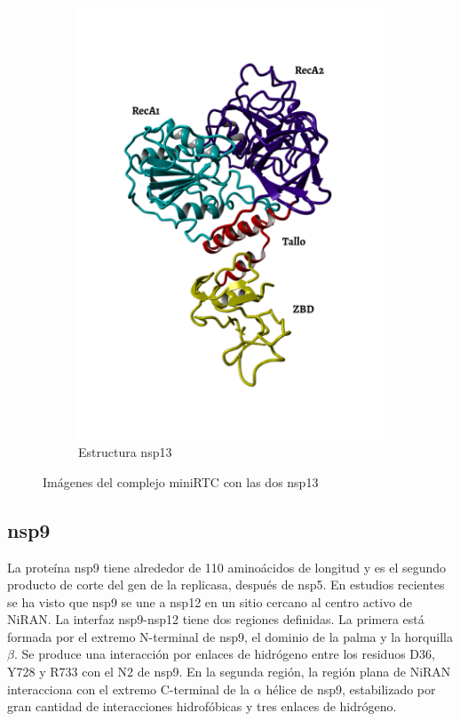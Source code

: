 \documentclass[a4paper,11pt]{report}
\begin{document}
\begin{figure}[h!]
\begin{subfigure}[h]{0.45\textwidth}
		\includegraphics[width=1.2\linewidth]{Figuras/Figura9}
		\caption{Estructura nsp13}		
		\label{13}
	\end{subfigure}
   
   \caption{Imágenes del complejo miniRTC con las dos nsp13}
   
\end{figure}

\subsection{nsp9}
La proteína nsp9 tiene alrededor de 110 aminoácidos de longitud y es el segundo producto de corte del gen de la replicasa, después de nsp5. 
En estudios recientes se ha visto que nsp9 se une a nsp12 en un sitio cercano al centro activo de NiRAN. La interfaz nsp9-nsp12 tiene dos regiones definidas. La primera está formada por el extremo N-terminal de nsp9, el dominio de la palma y la horquilla $\beta$. Se produce una interacción por enlaces de hidrógeno entre los residuos D36, Y728 y R733 con el N2 de nsp9.
En la segunda región, la región plana de NiRAN interacciona con el extremo C-terminal de la $\alpha$ hélice de nsp9, estabilizado por gran cantidad de interacciones hidrofóbicas y tres enlaces de hidrógeno.
\end{document}
